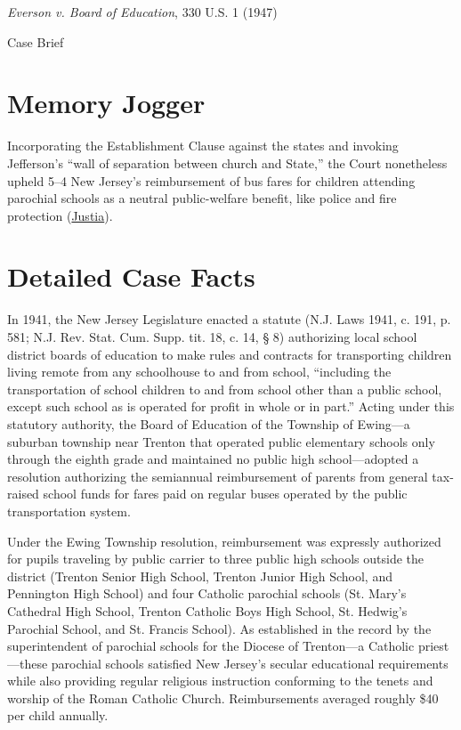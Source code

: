 \documentclass[12pt]{article}
\begin{document}
\begin{center}
{\LARGE \textit{Everson v. Board of Education}, 330 U.S. 1 (1947)\par}
\vspace{0.8em}
{\large Case Brief\par}
\end{center}
\vspace{1em}

\section{Memory Jogger}
Incorporating the Establishment Clause against the states and invoking Jefferson's ``wall of separation between church and State,'' the Court nonetheless upheld 5--4 New Jersey's reimbursement of bus fares for children attending parochial schools as a neutral public-welfare benefit, like police and fire protection (\href{https://supreme.justia.com/cases/federal/us/330/1/}{Justia}).

\section{Detailed Case Facts}
In 1941, the New Jersey Legislature enacted a statute (N.J. Laws 1941, c. 191, p. 581; N.J. Rev. Stat. Cum. Supp. tit. 18, c. 14, \S{} 8) authorizing local school district boards of education to make rules and contracts for transporting children living remote from any schoolhouse to and from school, ``including the transportation of school children to and from school other than a public school, except such school as is operated for profit in whole or in part.'' Acting under this statutory authority, the Board of Education of the Township of Ewing---a suburban township near Trenton that operated public elementary schools only through the eighth grade and maintained no public high school---adopted a resolution authorizing the semiannual reimbursement of parents from general tax-raised school funds for fares paid on regular buses operated by the public transportation system.

Under the Ewing Township resolution, reimbursement was expressly authorized for pupils traveling by public carrier to three public high schools outside the district (Trenton Senior High School, Trenton Junior High School, and Pennington High School) and four Catholic parochial schools (St. Mary's Cathedral High School, Trenton Catholic Boys High School, St. Hedwig's Parochial School, and St. Francis School). As established in the record by the superintendent of parochial schools for the Diocese of Trenton---a Catholic priest---these parochial schools satisfied New Jersey's secular educational requirements while also providing regular religious instruction conforming to the tenets and worship of the Roman Catholic Church. Reimbursements averaged roughly \$40 per child annually.
\end{document}
